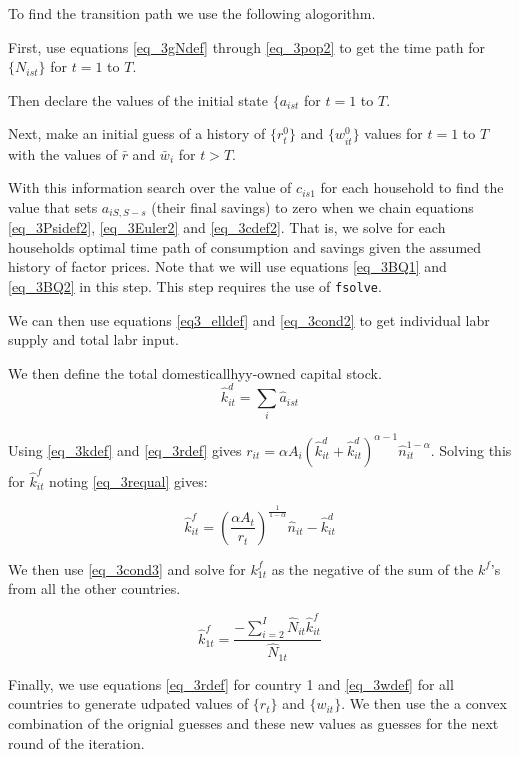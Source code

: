 \documentclass[letterpaper,12pt]{article}
\theoremstyle{definition}
\numberwithin{equation}{section}
\begin{document}
\begin{spacing}{1.5}
	To find the transition path we use the following alogorithm.

	First, use equations \eqref{eq_3gNdef} through \eqref{eq_3pop2} to get the time path for $\{N_{ist}\}$ for $t=1$ to $T$.

	Then declare the values of the initial state $\{a_{ist}$ for $t=1$ to $T$.

	Next, make an initial guess of a history of $\{r^0_t\}$ and $\{w^0_{it}\}$ values for $t=1$ to $T$ with the values of $\bar r$ and $\bar w_i$ for $t>T$.  

	With this information search over the value of $c_{is1}$ for each household to find the value that sets $a_{iS,S-s}$ (their final savings) to zero when we chain equations \eqref{eq_3Psidef2}, \eqref{eq_3Euler2} and \eqref{eq_3cdef2}.  That is, we solve for each households optimal time path of consumption and savings given the assumed history of factor prices.  Note that we will use equations \eqref{eq_3BQ1} and \eqref{eq_3BQ2} in this step.  This step requires the use of \texttt{fsolve}.

	We can then use equations \eqref{eq3_elldef} and \eqref{eq_3cond2} to get individual labr supply and total labr input.

	We then define the total domesticallhyy-owned capital stock.
	\begin{equation}
		\hat k^d_{it} = \sum_i \hat a_{ist} \label{eq_3kddef}
	\end{equation}

	Using \eqref{eq_3kdef} and \eqref{eq_3rdef} gives $r_{it} = \alpha A_i(\hat k^d_{it} + \hat k^d_{it})^{\alpha-1} \hat n_{it}^{1-\alpha}$.  Solving this for $\hat k^f_{it}$ noting \eqref{eq_3requal} gives:

	\begin{equation}
        \hat k^f_{it} = \left(\frac{\alpha A_t}{r_t}\right)^{\frac{1}{1-\alpha}} \hat n_{it} - \hat k^d_{it}
	\end{equation}

	We then use \eqref{eq_3cond3} and solve for $k^f_{1t}$ as the negative of the sum of the $k^f$'s from all the other countries.

	\begin{equation}
		\hat k^f_{1t} = \frac{-\sum_{i=2}^I \hat N_{it} \hat k^f_{it}}{\hat N_{1t}}
	\end{equation}

	Finally, we use equations \eqref{eq_3rdef} for country 1 and \eqref{eq_3wdef} for all countries to generate udpated values of $\{r_t\}$ and $\{w_{it}\}$.  We then use the a convex combination of the orignial guesses and these new values as guesses for the next round of the iteration.


\end{spacing}
\end{document}
